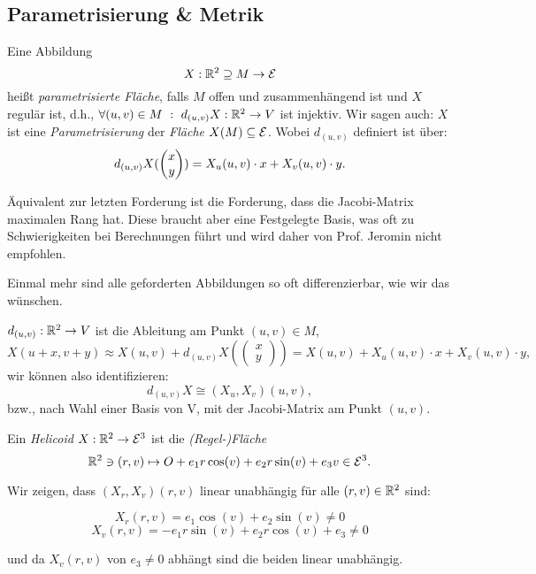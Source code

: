 
\subsection{Parametrisierung \& Metrik}
\begin{definition}
	

Eine Abbildung \[ X:\mathbb R^2 \supseteq M \rightarrow \mathcal E \] heißt \emph{parametrisierte Fläche}, falls $M$ offen und zusammenhängend ist und $X$ regulär ist, d.h., $  \forall(u,v) \in M~:~d_{(u,v)}X: \mathbb R^2 \rightarrow V $ ist injektiv.
Wir sagen auch: $  X  $ ist eine \emph{Parametrisierung} der \emph{Fläche} $ X(M) \subseteq \mathcal E $.
Wobei $ d_{(u,v)} $ definiert ist über:
	\[d_{(u,v)}X(\begin{pmatrix} x \\y \end{pmatrix})= X_u(u,v)\cdot x + X_v(u,v) \cdot y. \]

\end{definition}

\begin{remark}
	
 Äquivalent zur letzten Forderung ist die Forderung, dass die Jacobi-Matrix maximalen Rang hat. Diese braucht aber eine Festgelegte Basis, was oft zu Schwierigkeiten bei Berechnungen führt und wird daher von Prof. Jeromin nicht empfohlen.

\end{remark}

\begin{remark}
	Einmal mehr sind alle geforderten Abbildungen so oft differenzierbar, wie wir das wünschen.
\end{remark}

\begin{remark}
	
	$ d_{(u,v)} : \mathbb R^2 \rightarrow V$ ist die Ableitung am Punkt $ (u,v) \in M $, \[X(u+x,v+y) \approx X(u,v) + d_{(u,v)}  X(\begin{pmatrix}
	x\\
	y
	\end{pmatrix}) = X(u,v) + X_u(u,v)\cdot x + X_v(u,v)\cdot y,  \]
	wir können also identifizieren: \[ d_{(u,v)}X \cong (X_u,X_v)(u,v), \]
	bzw., nach Wahl einer Basis von V, mit der Jacobi-Matrix am Punkt $ (u,v) $.
	
\end{remark}

\begin{example}
	


Ein \emph{Helicoid} $ X: \mathbb R^2 \rightarrow \mathcal E^3 $ ist die \emph{(Regel-)Fläche}  
\[ \mathbb R^2 \ni (r,v) \mapsto O + e_1r \cos(v) + e_2 r \sin(v) + e_3 v \in \mathcal E^3. \]

Wir zeigen, dass $(X_r,X_v)(r,v)$ linear unabhängig für alle $ (r,v) \in \mathbb R^2 $ sind:

\[ X_r(r,v) = e_1\cos(v) + e_2 \sin(v) \neq 0 \]
\[ X_v(r,v) = -e_1r \sin(v) + e_2 r \cos(v) + e_3 \neq 0 \]

und da $ X_v(r,v) $ von $e_3 \neq 0$  abhängt sind die beiden linear unabhängig.

\end{example}

